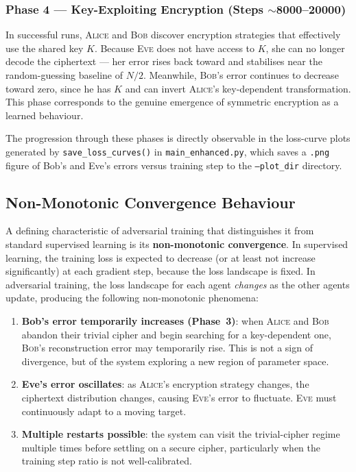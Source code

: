 \documentclass[12pt, a4paper]{article}
\newcommand{\alice}{\textsc{Alice}}
\newcommand{\bob}{\textsc{Bob}}
\newcommand{\eve}{\textsc{Eve}}
\newcommand{\code}[1]{\texttt{\color{CodeRed}#1}}
\begin{document}
\subsubsection*{Phase 4 --- Key-Exploiting Encryption (Steps $\sim$8000--20000)}

In successful runs, \alice{} and \bob{} discover encryption strategies
that effectively use the shared key $K$. Because \eve{} does not have
access to $K$, she can no longer decode the ciphertext --- her error
rises back toward and stabilises near the random-guessing baseline of
$N/2$. Meanwhile, \bob{}'s error continues to decrease toward zero,
since he has $K$ and can invert \alice{}'s key-dependent transformation.
This phase corresponds to the genuine emergence of symmetric encryption
as a learned behaviour.

The progression through these phases is directly observable in the
loss-curve plots generated by \code{save\_loss\_curves()} in
\code{main\_enhanced.py}, which saves a \texttt{.png} figure of Bob's
and Eve's errors versus training step to the \code{--plot\_dir} directory.

\subsection{Non-Monotonic Convergence Behaviour}
\label{subsec:nonmonotonic}

A defining characteristic of adversarial training that distinguishes
it from standard supervised learning is its \textbf{non-monotonic
convergence}. In supervised learning, the training loss is expected
to decrease (or at least not increase significantly) at each gradient
step, because the loss landscape is fixed. In adversarial training,
the loss landscape for each agent \emph{changes} as the other agents
update, producing the following non-monotonic phenomena:

\begin{enumerate}[leftmargin=2em, itemsep=5pt]

  \item \textbf{Bob's error temporarily increases (Phase~3)}: when
        \alice{} and \bob{} abandon their trivial cipher and begin
        searching for a key-dependent one, \bob{}'s reconstruction error
        may temporarily rise. This is not a sign of divergence, but of
        the system exploring a new region of parameter space.

  \item \textbf{Eve's error oscillates}: as \alice{}'s encryption
        strategy changes, the ciphertext distribution changes, causing
        \eve{}'s error to fluctuate. \eve{} must continuously adapt to
        a moving target.

  \item \textbf{Multiple restarts possible}: the system can visit
        the trivial-cipher regime multiple times before settling on
        a secure cipher, particularly when the training step ratio
        is not well-calibrated.

\end{enumerate}
\end{document}
